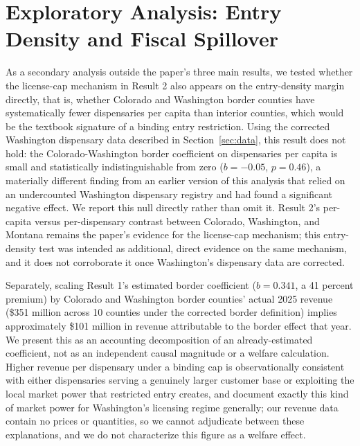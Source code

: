 \documentclass[12pt]{article}
\begin{document}
\section{Exploratory Analysis: Entry Density and Fiscal Spillover}
\label{app:welfare}

As a secondary analysis outside the paper's three main results, we tested whether the license-cap mechanism
in Result 2 also appears on the entry-density margin directly, that is, whether Colorado and Washington
border counties have systematically fewer dispensaries per capita than interior counties, which would be the
textbook signature of a binding entry restriction. Using the corrected Washington dispensary data described
in Section~\ref{sec:data}, this result does not hold: the Colorado-Washington border coefficient on
dispensaries per capita is small and statistically indistinguishable from zero ($b=-0.05$, $p=0.46$), a
materially different finding from an earlier version of this analysis that relied on an undercounted
Washington dispensary registry and had found a significant negative effect. We report this null directly
rather than omit it. Result 2's per-capita versus per-dispensary contrast between Colorado, Washington, and
Montana remains the paper's evidence for the license-cap mechanism; this entry-density test was intended as
additional, direct evidence on the same mechanism, and it does not corroborate it once Washington's
dispensary data are corrected.

Separately, scaling Result 1's estimated border coefficient ($b=0.341$, a 41 percent premium) by Colorado and
Washington border counties' actual 2025 revenue (\$351 million across 10 counties under the corrected border
definition) implies approximately \$101 million in revenue attributable to the border effect that year. We
present this as an accounting decomposition of an already-estimated coefficient, not as an independent
causal magnitude or a welfare calculation. Higher revenue per dispensary under a binding cap is
observationally consistent with either dispensaries serving a genuinely larger customer base or exploiting
the local market power that restricted entry creates, and \citet{HollenbeckUetake2021} document exactly this
kind of market power for Washington's licensing regime generally; our revenue data contain no prices or
quantities, so we cannot adjudicate between these explanations, and we do not characterize this figure as a
welfare effect.

\newpage


\end{document}
